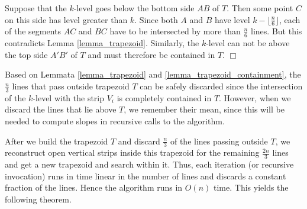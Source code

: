 \documentclass{elsart}
\newenvironment{proof}{{\bf Proof:} \rm}{\hfill $\Box$ \medskip\\}
\newcommand{\comment}[1]{}
\begin{document}
\begin{proof}
Suppose that the $k$-level goes below the bottom side $AB$ of $T$. Then
some point $C$ on this side has level greater than $k$. Since both
$A$ and $B$ have level $k - \lfloor\frac{n}{6}\rfloor$, each of the
segments $AC$ and $BC$ have to be intersected by more than
$\frac{n}{6}$ lines. But this contradicts Lemma \ref{lemma_trapezoid}.
Similarly, the $k$-level can not be above the top side $A'B'$ of $T$
and must therefore be contained in $T$.
\end{proof}

Based on Lemmata \ref{lemma_trapezoid} and
\ref{lemma_trapezoid_containment}, the $\frac{n}{3}$ lines that pass
outside trapezoid $T$ can be safely discarded since the intersection
of the $k$-level with the strip $V_i$ is completely contained in $T$.
However, when we discard the lines that lie above $T$, we remember
their mean, since this will be needed to compute slopes in recursive
calls to the algorithm.

\comment{
It may be observed that until recently in our discussion, we were trying to find the vertex on the boundary of the dual of the $k$-zonoid at which line $p_1^*$ becomes a tangent. But above we show that it is the $k$-level that lies completely inside the trapezoid $T$ and the vertex point is being searched for on the $k$-level, not on the boundary of the dual of the $k$-zonoid. This is because, 
\begin{enumerate}
\item we do not explicitly construct the $k$-zonoid in the dual,
\item each vertex on the boundary of the dual of the $k$-zonoid is calculated by taking the mean of the $k$ lines above a $k$-level vertex,
\item even though we disregard lines above and passing outside the trapezoid $T$, their equations can be associated with each $k$-level vertex and the corresponding $k$-zonoid dual vertex be computed, as need arises.  
\end{enumerate}
}

After we build the trapezoid $T$ and discard $\frac{n}{3}$ of the
lines passing outside $T$, we reconstruct open vertical strips inside
this trapezoid for the remaining $\frac{2n}{3}$ lines and get a new
trapezoid and search within it. Thus, each iteration (or recursive
invocation) runs in time linear in the number of lines and discards a
constant fraction of the lines. Hence the algorithm runs in $O(n)$
time. This yields the following theorem.
\end{document}
